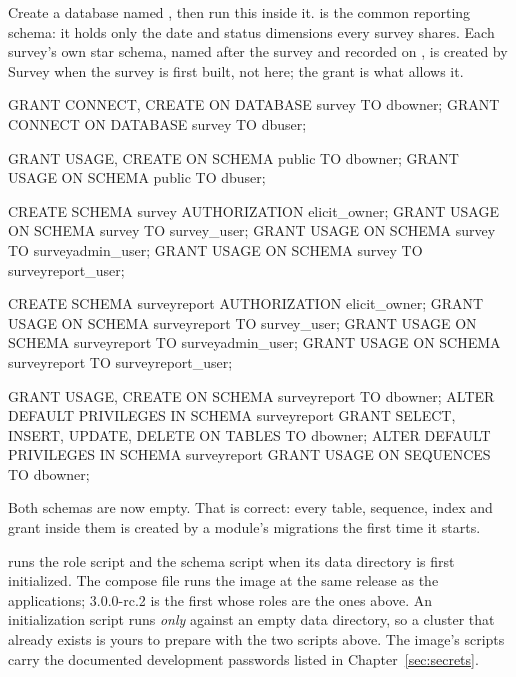 \documentclass[11pt, a4paper]{article}
\begin{document}
Create a database named , then run this inside it.  is the
common reporting schema: it holds only the date and status dimensions every survey shares.
Each survey's own star schema, named  after the survey and recorded on
, is created by Survey when the survey is first built, not
here; the  grant is what allows it.

\begin{elicitsql}
GRANT CONNECT, CREATE ON DATABASE survey TO dbowner;
GRANT CONNECT ON DATABASE survey TO dbuser;

GRANT USAGE, CREATE ON SCHEMA public TO dbowner;
GRANT USAGE ON SCHEMA public TO dbuser;

CREATE SCHEMA survey AUTHORIZATION elicit_owner;
GRANT USAGE ON SCHEMA survey TO survey_user;
GRANT USAGE ON SCHEMA survey TO surveyadmin_user;
GRANT USAGE ON SCHEMA survey TO surveyreport_user;

CREATE SCHEMA surveyreport AUTHORIZATION elicit_owner;
GRANT USAGE ON SCHEMA surveyreport TO survey_user;
GRANT USAGE ON SCHEMA surveyreport TO surveyadmin_user;
GRANT USAGE ON SCHEMA surveyreport TO surveyreport_user;

GRANT USAGE, CREATE ON SCHEMA surveyreport TO dbowner;
ALTER DEFAULT PRIVILEGES IN SCHEMA surveyreport
  GRANT SELECT, INSERT, UPDATE, DELETE ON TABLES TO dbowner;
ALTER DEFAULT PRIVILEGES IN SCHEMA surveyreport
  GRANT USAGE ON SEQUENCES TO dbowner;
\end{elicitsql}

Both schemas are now empty. That is correct: every table, sequence, index and grant inside
them is created by a module's migrations the first time it starts.

\begin{elicitnote}
 runs the role script and the schema script when its data
directory is first initialized. The compose file runs the image at the same release as the applications; 3.0.0-rc.2 is the first
whose roles are the ones above. An initialization script runs \emph{only} against an empty
data directory, so a cluster that already exists is yours to prepare with the two scripts
above. The image's scripts carry the documented development passwords listed in
Chapter~\ref{sec:secrets}.
\end{elicitnote}

\end{document}
